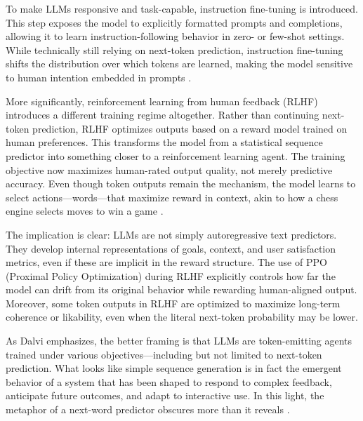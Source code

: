 To make LLMs responsive and task-capable, instruction fine-tuning is introduced. This step exposes the model to explicitly formatted prompts and completions, allowing it to learn instruction-following behavior in zero- or few-shot settings. While technically still relying on next-token prediction, instruction fine-tuning shifts the distribution over which tokens are learned, making the model sensitive to human intention embedded in prompts \parencite{dalvi2025}.

More significantly, reinforcement learning from human feedback (RLHF) introduces a different training regime altogether. Rather than continuing next-token prediction, RLHF optimizes outputs based on a reward model trained on human preferences. This transforms the model from a statistical sequence predictor into something closer to a reinforcement learning agent. The training objective now maximizes human-rated output quality, not merely predictive accuracy. Even though token outputs remain the mechanism, the model learns to select actions—words—that maximize reward in context, akin to how a chess engine selects moves to win a game \parencite{dalvi2025}.

The implication is clear: LLMs are not simply autoregressive text predictors. They develop internal representations of goals, context, and user satisfaction metrics, even if these are implicit in the reward structure. The use of PPO (Proximal Policy Optimization) during RLHF explicitly controls how far the model can drift from its original behavior while rewarding human-aligned output. Moreover, some token outputs in RLHF are optimized to maximize long-term coherence or likability, even when the literal next-token probability may be lower.

As Dalvi emphasizes, the better framing is that LLMs are token-emitting agents trained under various objectives—including but not limited to next-token prediction. What looks like simple sequence generation is in fact the emergent behavior of a system that has been shaped to respond to complex feedback, anticipate future outcomes, and adapt to interactive use. In this light, the metaphor of a next-word predictor obscures more than it reveals \parencite{dalvi2025}.



